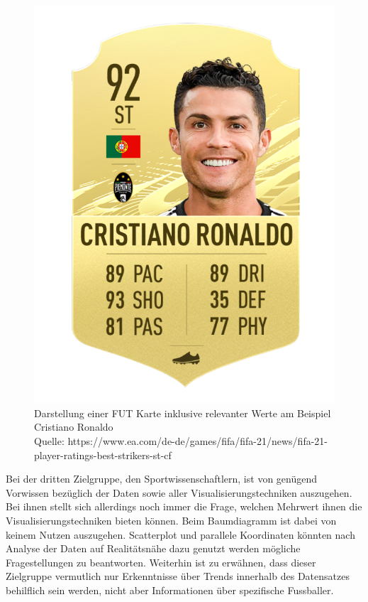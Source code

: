 \documentclass[usegeometry=true]{scrartcl}
\begin{document}
\begin{figure}
\centering
\includegraphics[scale=0.15]{grafiken/Ronaldo}
\caption{Darstellung einer FUT Karte inklusive relevanter Werte am Beispiel Cristiano Ronaldo\\ Quelle: https://www.ea.com/de-de/games/fifa/fifa-21/news/fifa-21-player-ratings-best-strikers-st-cf}
\label{Ronaldo}
\end{figure}
Bei der dritten Zielgruppe, den Sportwissenschaftlern, ist von genügend Vorwissen bezüglich der Daten sowie aller Visualisierungstechniken auszugehen. Bei ihnen stellt sich allerdings noch immer die Frage, welchen Mehrwert ihnen die Visualisierungstechniken bieten können. Beim Baumdiagramm ist dabei von keinem Nutzen auszugehen. Scatterplot und parallele Koordinaten könnten nach Analyse der Daten auf Realitätsnähe dazu genutzt werden mögliche Fragestellungen zu beantworten. Weiterhin ist zu erwähnen, dass dieser Zielgruppe vermutlich nur Erkenntnisse über Trends innerhalb des Datensatzes behilflich sein werden, nicht aber Informationen über spezifische Fussballer.\\
\end{document}
